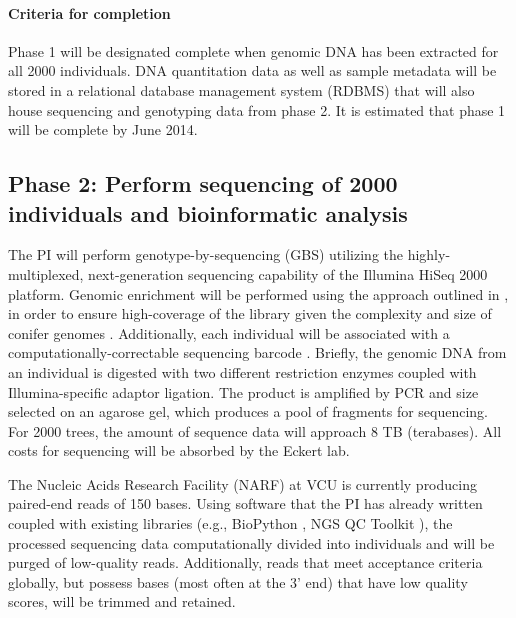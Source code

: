 \paragraph{Criteria for completion}
Phase 1 will be designated complete when genomic DNA has been extracted for all \num{2000} individuals.  
DNA quantitation data as well as sample metadata will be stored in a relational database management system (RDBMS) 
that will also house sequencing and genotyping data from phase 2.  It is estimated that phase 1 will be complete by June 2014.

\subsection*{Phase 2: Perform sequencing of 2000 individuals and bioinformatic analysis}

The PI will perform genotype-by-sequencing (GBS) utilizing the highly-multiplexed, next-generation sequencing capability of the 
Illumina HiSeq 2000 platform.  Genomic enrichment will be performed using the approach outlined in 
\cite{Parchman:2012ca}, in order to ensure high-coverage of the library given the complexity and size of conifer genomes 
\citep{Mackay:2012hr}.  Additionally, each individual will be associated with a computationally-correctable sequencing 
barcode \citep{Roche454MID}.  
Briefly, the genomic DNA from an individual is digested with two different restriction enzymes coupled with Illumina-specific 
adaptor ligation.  The product is amplified by PCR and size selected on an agarose gel, which produces a pool of fragments for 
sequencing.  For 2000 trees, the amount of sequence data will approach 8 TB (terabases).  All costs for sequencing will be 
absorbed by the Eckert lab.   

The Nucleic Acids Research Facility (NARF) at VCU is currently producing paired-end reads of 150 bases.  Using software that the 
PI has already written \citep{code:2008wq} coupled with existing libraries (e.g., BioPython \citep{Cock:2009hj}, NGS QC Toolkit 
\citep{Patel:2012fq}), the processed sequencing data computationally divided into individuals and will be purged of 
low-quality reads. Additionally, reads that meet acceptance criteria globally, but possess bases (most often at the 3' end) 
that have low quality scores, will be trimmed and retained.

